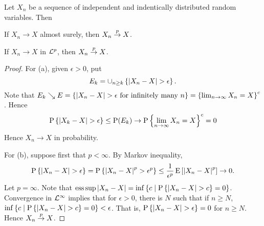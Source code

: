 \begin{proposition}
    Let $X_n$ be a sequence of independent and indentically 
    distributed random variables. Then 
    \begin{thmenum}
        \item If $X_n\to X$ almost surely, then $X_n\overset{p}{\to} X$. 
        \item If $X_n\to X$ in $\mathcal{L}^p$, then $X_n\overset{p}{\to} X$.  
    \end{thmenum}
\end{proposition}
\begin{proof}
    For (a), given $\epsilon>0$, put 
    \begin{equation*}
        E_k = \cup_{n\geq k}\left\{ {\left\lvert {X_n - X} \right\rvert>\epsilon} \right\}.
    \end{equation*}
    Note that $E_k\searrow E = \left\{ {\left\lvert {X_n - X} \right\rvert>\epsilon\text{ for infinitely many $n$}} \right\} = \left\{ {\lim_{n\to\infty} X_n = X} \right\}^c$. 
    Hence 
    \begin{equation*}
        \operatorname{P}\left\{ {\left\lvert {X_k - X} \right\rvert>\epsilon} \right\} \leq \operatorname{P}(E_k) \to \operatorname{P}\left\{ {\lim_{n\to\infty} X_n = X} \right\}^c = 0
    \end{equation*}
    Hence $X_n\to X$ in probability.  

    For (b), suppose first that $p<\infty$. By Markov inequality, 
    \begin{equation*}
        \operatorname{P}\left\{ {\left\lvert {X_n - X} \right\rvert>\epsilon} \right\} = \operatorname{P}\left\{ {\left\lvert {X_n-X} \right\rvert^p>\epsilon^p} \right\}
        \leq \frac{1}{\epsilon^p}\operatorname{E}\left[ {\left\lvert {X_n-X} \right\rvert^p} \right]\to 0. 
    \end{equation*}
    Let $p = \infty$. Note that $\operatorname{ess\,sup}\left\lvert {X_n - X} \right\rvert = \inf\left\{ c \;\middle\vert\; \operatorname{P}\left\{ {\left\lvert {X_n - X} \right\rvert>c} \right\} = 0 \right\}$. 
    Convergence in $\mathcal{L}^\infty$ implies that for $\epsilon>0$, there is 
    $N$ such that if $n\geq N$, $\inf\left\{ c \;\middle\vert\; \operatorname{P}\left\{ {\left\lvert {X_n - X} \right\rvert>c} \right\} = 0 \right\} < \epsilon$. 
    That is, $\operatorname{P}\left\{ {\left\lvert {X_n - X} \right\rvert>\epsilon} \right\} = 0$ for $n\geq N$. Hence 
    $X_n\overset{p}{\to} X$. 
\end{proof}